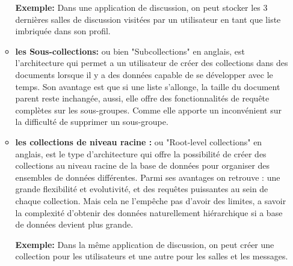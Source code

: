 \begin{enumerate}
\begin{itemize}
\textbf{Exemple:} Dans une application de discussion, on peut stocker les 3
dernières salles de discussion visitées par un utilisateur en tant que liste
imbriquée dans son profil.
\item \textbf{les Sous-collections:} ou bien "Subcollections" en anglais, est l'architecture qui permet a un utilisateur de créer des collections dans des documents lorsque il y a des données capable de se développer avec le temps. Son avantage est que si une liste s'allonge, la taille du document parent reste inchangée, aussi, elle offre des fonctionnalités de requête complètes sur les sous-groupes. Comme elle apporte un inconvénient sur la difficulté de supprimer un sous-groupe.
\item \textbf{les collections de niveau racine :} ou "Root-level collections" en anglais, est le type d'architecture qui offre la possibilité de créer des collections au niveau racine de la base de données pour organiser des ensembles de
données différentes. Parmi ses avantages on retrouve : une grande flexibilité et evolutivité, et des requêtes puissantes au sein de chaque collection. Mais cela ne l'empêche pas d'avoir des limites, a savoir la complexité d'obtenir des données naturellement hiérarchique si a base de données devient plus grande.

\textbf{Exemple:} Dans la même application de discussion, on peut créer une collection pour les utilisateurs et une autre pour les salles et les messages.
\end{itemize}

\end{enumerate}